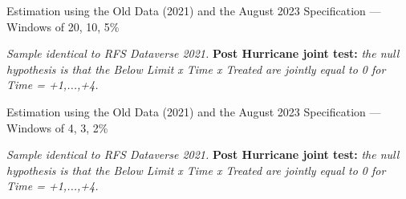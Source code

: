 \documentclass{article}
\begin{document}
\begin{sidewaystable}
        
    \caption{Estimation using the Old Data (2021) and the August 2023 Specification --- Windows of 20, 10, 5\%}

    \begin{center}
    
    \end{center}

    \emph{Sample identical to RFS Dataverse 2021.}
    \textbf{Post Hurricane joint test:} \emph{the null hypothesis is that the Below Limit x Time x Treated are jointly equal to 0 for Time = +1,...,+4.}


\end{sidewaystable}

\begin{sidewaystable}
        
    \caption{Estimation using the Old Data (2021) and the August 2023 Specification --- Windows of 4, 3, 2\%}

    \begin{center}
    
    \end{center}

    \emph{Sample identical to RFS Dataverse 2021.} 
    \textbf{Post Hurricane joint test:} \emph{the null hypothesis is that the Below Limit x Time x Treated are jointly equal to 0 for Time = +1,...,+4.}


\end{sidewaystable}
\end{document}
